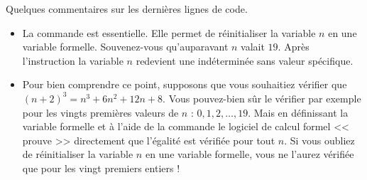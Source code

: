 \documentclass[class=report,crop=false]{standalone}
\begin{document}
\begin{remarque*}
Quelques commentaires sur les dernières lignes de code.
\begin{itemize}
  \item La commande  est essentielle. Elle permet de réinitialiser 
  la variable $n$ en une variable formelle. Souvenez-vous qu'auparavant 
  $n$ valait $19$. Après l'instruction  la variable $n$ redevient 
  une indéterminée  sans valeur spécifique.
   
  \item Pour bien comprendre ce point, supposons que vous souhaitiez vérifier que
  $(n+2)^3 = n^3 + 6n^2+12n+8$.
  Vous pouvez-bien sûr le vérifier par exemple pour les vingts premières valeurs de $n$ : $0,1,2,\ldots,19$.
  Mais en définissant la variable formelle  et à l'aide
  de la commande  le logiciel de calcul formel
  << prouve >> directement que l'égalité est vérifiée pour tout $n$.
  Si vous oubliez de réinitialiser la variable $n$ en une variable formelle, 
  vous ne l'aurez vérifiée que pour les vingt premiers entiers !
 
\end{itemize}
  
  
\end{remarque*}


% 
%   
%   

\finchapitre
\end{document}
